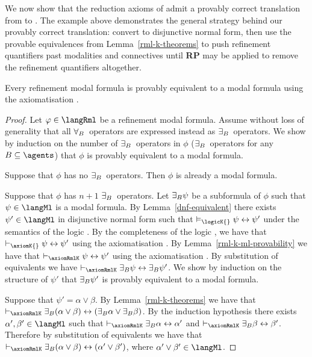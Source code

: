 We now show that the reduction axioms of \logicRmlK{} admit a provably correct translation from \langRml{} to \langMl{}.
The example above demonstrates the general strategy behind our provably correct translation: convert to disjunctive normal form, then use the provable equivalences from Lemma~\ref{rml-k-theorems} to push refinement quantifiers past modalities and connectives until {\bf RP} may be applied to remove the refinement quantifiers altogether.

\begin{lemma}\label{rml-k-ml-equivalent}
Every refinement modal formula is provably equivalent to a modal formula using the axiomatisation \axiomRmlK{}.
\end{lemma}

\begin{proof}
Let $\phi \in \langRml$ be a refinement modal formula.
Assume without loss of generality that all ${\forall_{B}}$~operators are expressed instead as ${\exists_{B}}$~operators.
We show by induction on the number of ${\exists_{B}}$~operators in $\phi$ (${\exists_{B}}$~operators for any $\agentsB \subseteq \agents$) that $\phi$ is provably equivalent to a modal formula.

Suppose that $\phi$ has no ${\exists_{B}}$~operators.
Then $\phi$ is already a modal formula.

Suppose that $\phi$ has $n + 1$ ${\exists_{B}}$~operators.
Let ${\exists_{B}} \psi$ be a subformula of $\phi$ such that $\psi \in \langMl$ is a modal formula.
By Lemma~\ref{dnf-equivalent} there exists $\psi' \in \langMl$ in disjunctive normal form such that $\entails_\logicK{} \psi \iff \psi'$ under the semantics of the logic \logicK{}.
By the completeness of the logic \logicK{}, we have that $\proves_\axiomK{} \psi \iff \psi'$ using the axiomatisation \axiomK{}.
By Lemma~\ref{rml-k-ml-provability} we have that $\proves_\axiomRmlK \psi \iff \psi'$ using the axiomatisation \axiomRmlK{}.
By substitution of equivalents we have $\proves_\axiomRmlK \somerefsBs \psi \iff \somerefsBs \psi'$.
We show by induction on the structure of $\psi'$ that ${\exists_{B}} \psi'$ is provably equivalent to a modal formula.

Suppose that $\psi' = \alpha \lor \beta$.
By Lemma~\ref{rml-k-theorems} we have that $\proves_\axiomRmlK \somerefsBs (\alpha \lor \beta) \iff (\somerefsBs \alpha \lor \somerefsBs \beta)$.
By the induction hypothesis there exists $\alpha', \beta' \in \langMl$ such that $\proves_\axiomRmlK \somerefsBs \alpha \iff \alpha'$ and $\proves_\axiomRmlK \somerefsBs \beta \iff \beta'$.
Therefore by substitution of equivalents we have that $\proves_\axiomRmlK \somerefsBs (\alpha \lor \beta) \iff (\alpha' \lor \beta')$, where $\alpha' \lor \beta' \in \langMl$.


\end{proof}
